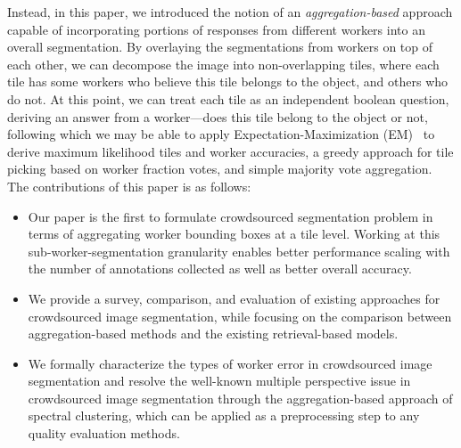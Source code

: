 Instead, in this paper, we introduced the notion of an {\em aggregation-based} approach capable of incorporating portions of responses from different workers into an overall segmentation.
By overlaying the segmentations from workers on top of each other, we can decompose the image into non-overlapping tiles,
where each tile has some workers who believe this tile belongs to the object, and others who do not.
At this point, we can treat each tile as an independent boolean question, deriving an answer from a worker---does
this tile belong to the object or not, following which we may be able to apply Expectation-Maximization (EM)~\cite{Dawid1979}
to derive maximum likelihood tiles and worker accuracies, a greedy approach for tile picking based on worker fraction votes, and simple majority vote aggregation.
 
The contributions of this paper is as follows: 
\begin{itemize}
	\item Our paper is the first to formulate crowdsourced segmentation problem in terms of aggregating worker bounding boxes at a tile level. Working at this sub-worker-segmentation granularity enables better performance scaling with the number of annotations collected as well as better overall accuracy.
	\item We provide a survey, comparison, and evaluation of existing approaches for crowdsourced image segmentation, while focusing on the comparison between aggregation-based methods and the existing retrieval-based models.
	\item We formally characterize the types of worker error in crowdsourced image segmentation and resolve the well-known multiple perspective issue in crowdsourced image segmentation through the aggregation-based approach of spectral clustering, which can be applied as a preprocessing step to any quality evaluation methods.
\end{itemize}

